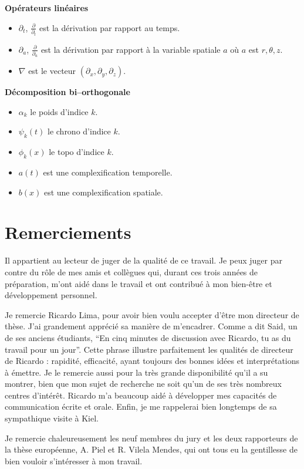 \documentclass{book}
\begin{document}
{\bf Op\'erateurs lin\'eaires}
\begin{itemize}
\item $\partial_t$, $\frac{\partial}{\partial_t}$ est la d\'erivation
par rapport au temps.
\item $\partial_a$, $\frac{\partial}{\partial_a}$ est la d\'erivation
par rapport \`a la variable spatiale $a$ o\`u $a$ est $r, \theta, z$.
\item $\nabla$ est le vecteur $(\partial_x, \partial_y, \partial_z)$.
\end{itemize}

{\bf D\'ecomposition bi--orthogonale}
\begin{itemize}
\item $\alpha_k$ le poids d'indice $k$.
\item $\psi_k(t)$ le chrono  d'indice $k$.
\item $\phi_k(x)$ le topo  d'indice $k$.
\item $a(t)$ est une complexification temporelle.
\item $b(x)$ est une complexification spatiale.
\end{itemize}


\chapter*{Remerciements}
Il appartient au lecteur de juger de la qualit\'e de ce travail. Je
peux juger par contre du r\^ole de mes amis et coll\`egues qui, durant
ces trois ann\'ees de pr\'eparation, m'ont aid\'e dans le
travail et ont 
contribu\'e  \`a mon bien-\^etre et d\'eveloppement personnel.

Je remercie Ricardo Lima, pour avoir bien voulu accepter d'\^etre mon
directeur de th\`ese. J'ai grandement appr\'eci\'e sa mani\`ere
de m'encadrer. Comme a dit Said, un de ses anciens
\'etudiants, ``En cinq minutes de discussion avec Ricardo, tu as du
travail pour un jour''. Cette phrase illustre parfaitement les
qualit\'es de directeur de Ricardo : rapidit\'e, efficacit\'e, ayant
toujours des bonnes id\'ees et interpr\'etations \`a \'emettre. Je le
remercie aussi pour la tr\`es grande disponibilit\'e qu'il a su
montrer, bien que mon sujet de recherche ne soit qu'un de ses tr\`es
nombreux centres d'int\'er\^et.
Ricardo m'a beaucoup aid\'e \`a d\'evelopper mes capacit\'es de
communication \'ecrite et orale. Enfin, je me rappelerai bien
longtemps de sa sympathique visite \`a Kiel.

Je remercie chaleureusement les neuf membres du jury et les deux
rapporteurs 
de la th\`ese europ\'eenne, A. Piel et R. Vilela Mendes, qui ont tous
eu la gentillesse 
de bien vouloir s'int\'eresser \`a mon travail. 
\end{document}
